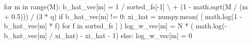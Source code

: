 \documentclass[
  letterpaper,
  DIV=11,
  numbers=noendperiod]{scrartcl}
\newenvironment{Shaded}{\begin{snugshade}}{\end{snugshade}}
\newcommand{\BuiltInTok}[1]{\textcolor[rgb]{0.00,0.23,0.31}{#1}}
\newcommand{\ControlFlowTok}[1]{\textcolor[rgb]{0.00,0.23,0.31}{#1}}
\newcommand{\DecValTok}[1]{\textcolor[rgb]{0.68,0.00,0.00}{#1}}
\newcommand{\FloatTok}[1]{\textcolor[rgb]{0.68,0.00,0.00}{#1}}
\newcommand{\KeywordTok}[1]{\textcolor[rgb]{0.00,0.23,0.31}{#1}}
\newcommand{\NormalTok}[1]{\textcolor[rgb]{0.00,0.23,0.31}{#1}}
\newcommand{\OperatorTok}[1]{\textcolor[rgb]{0.37,0.37,0.37}{#1}}
\begin{document}
\begin{Shaded}
\begin{Highlighting}[]
  \ControlFlowTok{for}\NormalTok{ m }\KeywordTok{in} \BuiltInTok{range}\NormalTok{(M):}
\NormalTok{    b\_hat\_vec[m] }\OperatorTok{=}   \DecValTok{1} \OperatorTok{/}\NormalTok{ sorted\_fs[}\OperatorTok{{-}}\DecValTok{1}\NormalTok{] }\OperatorTok{\textbackslash{}}
                   \OperatorTok{+}\NormalTok{ (}\DecValTok{1} \OperatorTok{{-}}\NormalTok{ math.sqrt(M }\OperatorTok{/}\NormalTok{ (m }\OperatorTok{+} \FloatTok{0.5}\NormalTok{))) }\OperatorTok{/}\NormalTok{ (}\DecValTok{3} \OperatorTok{*}\NormalTok{ q)}
    \ControlFlowTok{if}\NormalTok{ b\_hat\_vec[m] }\OperatorTok{!=} \DecValTok{0}\NormalTok{:}
\NormalTok{      xi\_hat }\OperatorTok{=}\NormalTok{ numpy.mean( [ math.log(}\DecValTok{1} \OperatorTok{{-}}\NormalTok{ b\_hat\_vec[m] }\OperatorTok{*}\NormalTok{ f) }
                             \ControlFlowTok{for}\NormalTok{ f }\KeywordTok{in}\NormalTok{ sorted\_fs ] )}
\NormalTok{      log\_w\_vec[m] }\OperatorTok{=}\NormalTok{ N }\OperatorTok{*}\NormalTok{ (   math.log(}\OperatorTok{{-}}\NormalTok{b\_hat\_vec[m] }\OperatorTok{/}\NormalTok{ xi\_hat) }
                           \OperatorTok{{-}}\NormalTok{ xi\_hat }\OperatorTok{{-}} \DecValTok{1}\NormalTok{)}
    \ControlFlowTok{else}\NormalTok{:}
\NormalTok{      log\_w\_vec[m] }\OperatorTok{=} \DecValTok{0}
\end{Highlighting}
\end{Shaded}
\end{document}
